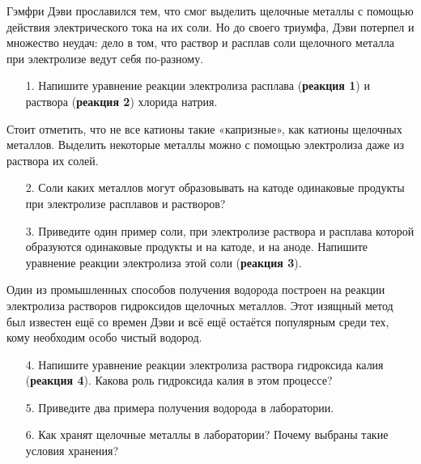 Гэмфри Дэви прославился тем, что смог выделить щелочные металлы с помощью действия электрического тока на их соли. Но до своего триумфа, Дэви потерпел и множество неудач: дело в том, что раствор и расплав соли щелочного металла при электролизе ведут себя по-разному.
\begin{enumerate}
\item[1.] Напишите уравнение реакции электролиза расплава (\textbf{реакция 1}) и раствора (\textbf{реакция 2}) хлорида натрия. 
\end{enumerate}
Стоит отметить, что не все катионы такие «капризные», как катионы щелочных металлов. Выделить некоторые металлы можно с помощью электролиза даже из раствора их солей.
\begin{enumerate}
\item[2.] Соли каких металлов могут образовывать на катоде одинаковые продукты при электролизе расплавов и растворов? 
\item[3.] Приведите один пример соли, при электролизе раствора и расплава которой образуются одинаковые продукты и на катоде, и на аноде. Напишите уравнение реакции электролиза этой соли (\textbf{реакция 3}).
\end{enumerate}
Один из промышленных способов получения водорода построен на реакции электролиза растворов гидроксидов щелочных металлов. Этот изящный метод был известен ещё со времен Дэви и всё ещё остаётся популярным среди тех, кому необходим особо чистый водород.
\begin{enumerate}
\item[4.] Напишите уравнение реакции электролиза раствора гидроксида калия (\textbf{реакция 4}). Какова роль гидроксида калия в этом процессе?
\item[5.] Приведите два примера получения водорода в лаборатории.
\item[6.] Как хранят щелочные металлы в лаборатории? Почему выбраны такие условия хранения?
\end{enumerate}